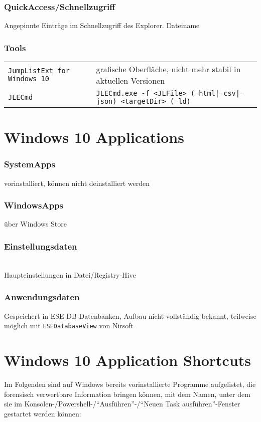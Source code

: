 \begin{multicols}{3}
\subsubsection{QuickAccess/Schnellzugriff}
Angepinnte Einträge im Schnellzugriff des Explorer. Dateiname 

\subsubsection{Tools}
\begin{tabular}{@{}p{\the\MyLen}%
		@{}p{\linewidth-\the\MyLen}@{}}
	\texttt{JumpListExt for Windows 10} & grafische Oberfläche, nicht mehr stabil in aktuellen Versionen\\
	\texttt{JLECmd} & \texttt{JLECmd.exe -f <JLFile> (--html|--csv|--json) <targetDir> (--ld)}\\
\end{tabular}

\section{Windows 10 Applications}
\subsubsection{SystemApps}
vorinstalliert, können nicht deinstalliert werden\\
\subsubsection{WindowsApps}
über Windows Store
\subsubsection{Einstellungsdaten}
\\
Haupteinstellungen in Datei/Registry-Hive 
\subsubsection{Anwendungsdaten}
Gespeichert in ESE-DB-Datenbanken, Aufbau nicht vollständig bekannt, teilweise möglich mit \texttt{ESEDatabaseView} von Nirsoft

\section{Windows 10 Application Shortcuts}
Im Folgenden sind auf Windows bereits vorinstallierte Programme aufgelistet, die forensisch verwertbare Information bringen können, mit dem Namen, unter dem sie im Konsolen-/Powershell-/\enquote{Ausführen}-/\enquote{Neuen Task ausführen}-Fenster gestartet werden können:


\end{multicols}
